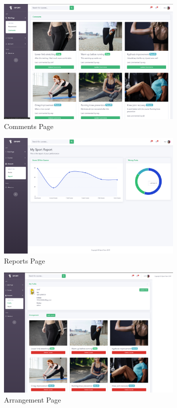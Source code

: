 \documentclass[16pt]{scrreprt}
\begin{document}
\begin{figure}[H]
	\centering
	\includegraphics[width=0.8\textwidth]{diagrams/comment.png}
	\caption{Comments Page}
\end{figure}

\begin{figure}[H]
	\centering
	\includegraphics[width=0.8\textwidth]{diagrams/report.png}
	\caption{Reports Page}
\end{figure}

\begin{figure}[H]
	\centering
	\includegraphics[width=0.8\textwidth]{diagrams/arrange.png}
	\caption{Arrangement Page}
\end{figure}
\end{document}

